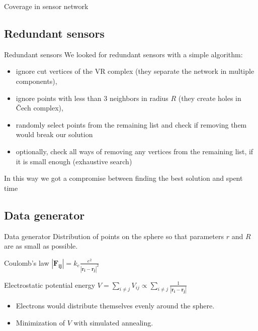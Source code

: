 \documentclass{beamer}
\newcommand{\vect}[1]{\boldsymbol{#1}}
\begin{document}
\begin{frame}{Coverage in sensor network}
\begin{figure}[!ht]
\end{figure}
\end{frame}


\subsection{Redundant sensors}
\begin{frame}{Redundant sensors}{}
We looked for redundant sensors with a simple algorithm:
\begin{itemize}
	\item ignore cut vertices of the VR complex (they separate the network in multiple components),
	\item ignore points with less than 3 neighbors in radius $R$ (they create holes in Čech complex),
	\item randomly select points from the remaining list and check if removing them would break our solution
	\item optionally, check all ways of removing any vertices from the remaining list, if it is small enough (exhaustive search)
\end{itemize}
In this way we got a compromise between finding the best solution and spent time

\end{frame}





\subsection{Data generator}
\begin{frame}{Data generator}{}
Distribution of points on the sphere so that parameters $r$ and $R$ are as small as possible.
\begin{alertblock}{Coulomb's law}
	\centering $|\vect{F_{ij}}| = k_e \frac{e^2}{|\vect{r_i}-\vect{r_j}|^2}$
\end{alertblock}
\begin{alertblock}{Electrostatic potential energy}
	\centering $V = \sum_{i\neq j}V_{ij} \propto \sum_{i\neq j}\frac{1}{|\vect{r_i} - \vect{r_j}|}$
\end{alertblock}
\begin{itemize}
	\item {Electrons would distribute themselves evenly around the sphere. }
	\item {Minimization of $V$ with simulated annealing.}
\end{itemize}

\end{frame}
\end{document}

